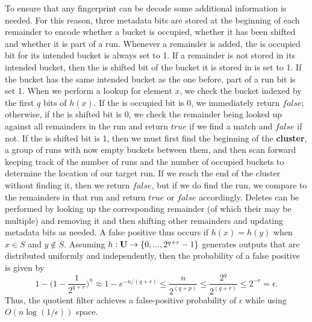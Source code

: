 \documentclass[../paper.tex]{subfiles}
\begin{document}
    To ensure that any fingerprint can be decode some additional information is
    needed.   For this reason, three metadata bits are stored at the beginning
    of each remainder to encode whether a bucket is occupied, whether it has
    been shifted and whether it is part of a run.  Whenever a remainder is
    added, the is occupied bit for its intended bucket is always set to 1.  If
    a remainder is not stored in its intended bucket, then the is shifted bit
    of the bucket it is stored in is set to 1.  If the bucket has the same
    intended bucket as the one before, part of a run bit is set 1.  When we
    perform a lookup for element $x$, we check the bucket indexed by the first
    $q$ bits of $h(x)$.  If the is occupied bit is 0, we immediately return
    $false$; otherwise, if the is shifted bit is 0, we check the remainder
    being looked up against all remainders in the run and return $true$ if we
    find a match and $false$ if not.  If the is shifted bit is 1, then we must
    first find the beginning of the {\bf cluster}, a group of runs with now
    empty buckets between them, and then scan forward keeping track of the
    number of runs and the number of occupied buckets to determine the location
    of our target run.  If we reach the end of the cluster without finding it,
    then we return $false$, but if we do find the run, we compare to the
    remainders in that run and return $true$ or $false$ accordingly.  Deletes
    can be performed by looking up the corresponding remainder (of which their
    may be multiple) and removing it and then shifting other remainders and
    updating metadata bits as needed.  A false positive thus occurs if $h(x) =
    h(y)$ when $x \in S$ and $y \notin S$.  Assuming $h: {\bf U} \rightarrow
    \{0, ... , 2^{q+r}-1\}$ generates outputs that are distributed uniformly
    and independently, then the probability of a false positive is given by $$
    1 - \big(1 - \frac{1}{2^{q+r}}\big)^n \approx 1- e^{-n/(q+r)} \leq
    \frac{n}{2^{(q+p)}} \leq \frac{2^q}{2^{(q+r)}} \leq 2^{-r} = \epsilon .$$
    Thus, the quotient filter achieves a false-positive probability of
    $\epsilon$ while using $O(n \log (1/\epsilon))$ space.  	
\end{document}
